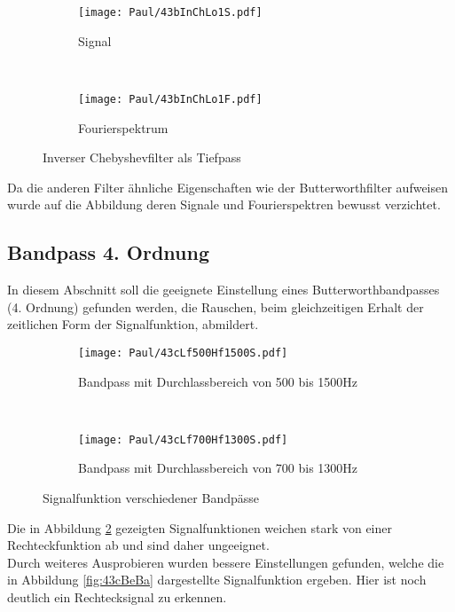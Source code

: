 \begin{figure}[h]
    \centering
    \begin{subfigure}{0.9\textwidth}
        \centering
        \texttt{[image: Paul/43bInChLo1S.pdf]}
        \caption{Signal}
    \end{subfigure}
    \\
    \begin{subfigure}{0.9\textwidth}
        \centering
        \texttt{[image: Paul/43bInChLo1F.pdf]}
        \caption{Fourierspektrum}
    \end{subfigure}
    \caption{Inverser Chebyshevfilter als Tiefpass}
    \label{fig:43bInChLo1}
\end{figure}

Da die anderen Filter ähnliche Eigenschaften wie der Butterworthfilter aufweisen wurde auf die Abbildung deren Signale und Fourierspektren bewusst verzichtet.\\

\newpage
\subsection{Bandpass 4. Ordnung}

In diesem Abschnitt soll die geeignete Einstellung eines Butterworthbandpasses (4. Ordnung) gefunden werden, die Rauschen, beim gleichzeitigen Erhalt der zeitlichen Form der Signalfunktion, abmildert.
\begin{figure}[h]
    \centering
    \begin{subfigure}{0.9\textwidth}
        \centering
        \texttt{[image: Paul/43cLf500Hf1500S.pdf]}
        \caption{Bandpass mit Durchlassbereich von 500 bis 1500Hz}
    \end{subfigure}
    \\
    \begin{subfigure}{0.9\textwidth}
        \centering
        \texttt{[image: Paul/43cLf700Hf1300S.pdf]}
        \caption{Bandpass mit Durchlassbereich von 700 bis 1300Hz}
    \end{subfigure}
    \caption{Signalfunktion verschiedener Bandpässe}
    \label{fig:43cverBa}
\end{figure}

Die in Abbildung \ref{fig:43cverBa} gezeigten Signalfunktionen weichen stark von einer Rechteckfunktion ab und sind daher ungeeignet.\\
Durch weiteres Ausprobieren wurden bessere Einstellungen gefunden, welche die in Abbildung \ref{fig:43cBeBa} dargestellte Signalfunktion ergeben. Hier ist noch deutlich ein Rechtecksignal zu erkennen.\\

